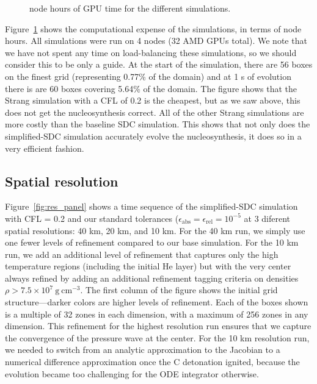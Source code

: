 \documentclass[modern]{aastex631}
\newcommand{\gcc}{\mathrm{g~cm^{-3} }}
\begin{document}
\begin{figure}[t]
\centering
{}
\caption{\label{fig:cpu} node hours of GPU time for the different simulations.}
\end{figure}




Figure~\ref{fig:cpu} shows the computational expense of the
simulations, in terms of node hours.  All simulations were run on 4
nodes (32 AMD GPUs total).  We note that we have not spent any time on
load-balancing these simulations, so we should consider this to be
only a guide.  At the start of the simulation, there are 56 boxes on
the finest grid (representing 0.77\% of the domain) and at 1 s of
evolution there is are 60 boxes covering 5.64\% of the domain.  The
figure shows that the Strang simulation with a CFL of 0.2 is the
cheapest, but as we saw above, this does not get the nucleosynthesis
correct.  All of the other Strang simulations are more costly than the
baseline SDC simulation.  This shows that not only does the
simplified-SDC simulation accurately evolve the nucleosynthesis, it
does so in a very efficient fashion.

\subsection{Spatial resolution}

Figure~\ref{fig:res_panel} shows a time sequence of the simplified-SDC
simulation with CFL = 0.2 and our standard tolerances
($\epsilon_\mathrm{abs} = \epsilon_\mathrm{rel} = 10^{-5}$ at 3
diferent spatial resolutions: 40 km, 20 km, and 10 km.  For the 40 km
run, we simply use one fewer levels of refinement compared to our base
simulation.  For the 10 km run, we add an additional level of
refinement that captures only the high temperature regions (including
the initial He layer) but with the very center always refined by
adding an additional refinement tagging criteria on densities $\rho >
7.5\times 10^7~\gcc$.  The first column of the figure shows the
initial grid structure---darker colors are higher levels of
refinement.  Each of the boxes shown is a multiple of 32 zones in each
dimension, with a maximum of 256 zones in any dimension.  This
refinement for the highest resolution run ensures that we capture the
convergence of the pressure wave at the center.  For the 10 km resolution
run, we needed to switch from an analytic approximation to the Jacobian
to a numerical difference approximation once the C detonation ignited, because
the evolution became too challenging for the ODE integrator otherwise.
\end{document}

